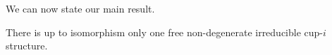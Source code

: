 We can now state our main result.

\begin{theorem} \label{t:main}
	There is up to isomorphism only one free non-degenerate irreducible cup-$i$ structure.
\end{theorem}


%

%
%



